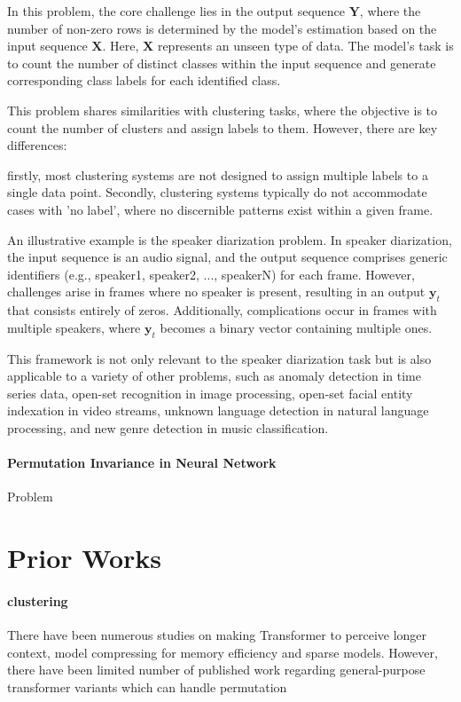 \documentclass{article}
\begin{document}
In this problem, the core challenge lies in the output sequence $\mathbf{Y}$, where the number of non-zero rows is determined by the model's estimation 
based on the input sequence $\mathbf{X}$. Here, $\mathbf{X}$ represents an unseen type of data. The model's task is to count the number of distinct classes 
within the input sequence and generate corresponding class labels for each identified class.

This problem shares similarities with clustering tasks, where the objective is to count the number of clusters and assign labels to them. However, 
there are key differences: 

firstly, most clustering systems are not designed to assign multiple labels to a single data point. Secondly, clustering systems
 typically do not accommodate cases with 'no label', where no discernible patterns exist within a given frame.

An illustrative example is the speaker diarization problem. In speaker diarization, the input sequence is an audio signal, and the output sequence comprises 
generic identifiers (e.g., speaker1, speaker2, ..., speakerN) for each frame. However, challenges arise in frames where no speaker is present, resulting in 
an output $\mathbf{y}_t$ that consists entirely of zeros. Additionally, complications occur in frames with multiple speakers, where $\mathbf{y}_t$ becomes
 a binary vector containing multiple ones.

This framework is not only relevant to the speaker diarization task but is also applicable to a variety of other problems, such as 
anomaly detection in time series data, 
open-set recognition in image processing,
open-set facial entity indexation in video streams,
unknown language detection in natural language processing, 
and new genre detection in music classification.





\paragraph{Permutation Invariance in Neural Network}
Problem

\section{Prior Works}

\paragraph{clustering}
There have been numerous studies on making Transformer to perceive longer context, model compressing for memory efficiency and sparse models. However, there have been limited number of published work regarding general-purpose transformer variants which can handle permutation
\end{document}
